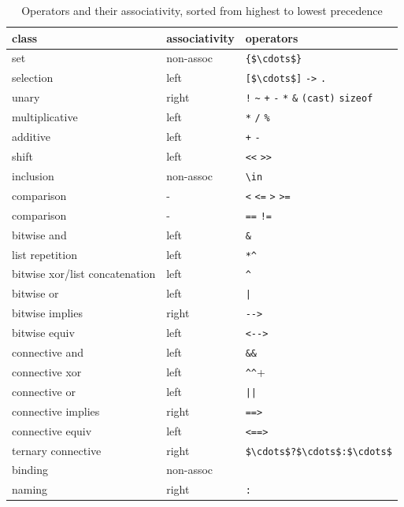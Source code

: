 \begin{table}
  \caption{Operators and their associativity, sorted from highest to lowest precedence}
  \begin{center}
    \begin{tabular}{|l|l|l|}
      \hline
      class 	& associativity & operators \\
      \hline
      set & non-assoc & \lstinline|{$\cdots$}| \\
      selection & left & \lstinline|[$\cdots$]| \lstinline|->| \lstinline|.| \\
      unary 	& right & \lstinline|!| \lstinline|~| \lstinline|+|
      \lstinline|-| \lstinline|*| \lstinline|&| \lstinline|(cast)|
      \lstinline|sizeof| \\
      multiplicative & left & \lstinline|*| \lstinline|/|  \lstinline|%| \\
      additive & left & \lstinline|+| \lstinline|-| \\
      shift 	& left & \lstinline|<<| \lstinline|>>| \\
      inclusion & non-assoc & \lstinline|\in| \\
      comparison & - & \lstinline|<| \lstinline|<=| \lstinline|>| \lstinline|>=| \\
      comparison & - & \lstinline|==| \lstinline|!=| \\
      bitwise and & left & \lstinline|&| \\
      list repetition & left & \lstinline|*^| \\
      bitwise xor/list concatenation & left & \lstinline|^| \\
      bitwise or & left & \lstinline+|+ \\
      bitwise implies & right & \lstinline+-->+ \\
      bitwise equiv & left & \lstinline+<-->+ \\
      connective and & left & \lstinline|&&| \\
      connective xor & left & \lstinline+^^+ \\
      connective or & left & \lstinline+||+ \\
      connective implies & right & \lstinline|==>| \\
      connective equiv & left & \lstinline|<==>| \\
      ternary connective & right & \lstinline|$\cdots$?$\cdots$:$\cdots$| \\
      binding & non-assoc & \Forall{} \Exists{} \Let{} \\
      naming & right & \lstinline|:| \\
      \hline
    \end{tabular}
  \end{center}
\label{tab:precedence}
\end{table}

